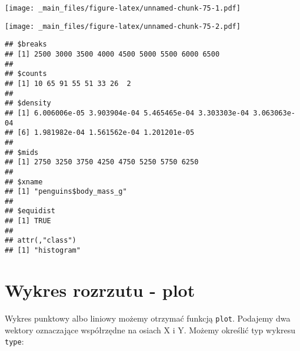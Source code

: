 \documentclass[
]{book}
\newenvironment{Shaded}{\begin{snugshade}}{\end{snugshade}}
\newcommand{\AttributeTok}[1]{\textcolor[rgb]{0.77,0.63,0.00}{#1}}
\newcommand{\CommentTok}[1]{\textcolor[rgb]{0.56,0.35,0.01}{\textit{#1}}}
\newcommand{\ConstantTok}[1]{\textcolor[rgb]{0.00,0.00,0.00}{#1}}
\newcommand{\DecValTok}[1]{\textcolor[rgb]{0.00,0.00,0.81}{#1}}
\newcommand{\FunctionTok}[1]{\textcolor[rgb]{0.00,0.00,0.00}{#1}}
\newcommand{\NormalTok}[1]{#1}
\newcommand{\SpecialCharTok}[1]{\textcolor[rgb]{0.00,0.00,0.00}{#1}}
\newcommand{\StringTok}[1]{\textcolor[rgb]{0.31,0.60,0.02}{#1}}
\begin{document}
\texttt{[image: \_main\_files/figure-latex/unnamed-chunk-75-1.pdf]}

\begin{Shaded}
\end{Shaded}

\texttt{[image: \_main\_files/figure-latex/unnamed-chunk-75-2.pdf]}

\begin{Shaded}
\end{Shaded}

\begin{verbatim}
## $breaks
## [1] 2500 3000 3500 4000 4500 5000 5500 6000 6500
## 
## $counts
## [1] 10 65 91 55 51 33 26  2
## 
## $density
## [1] 6.006006e-05 3.903904e-04 5.465465e-04 3.303303e-04 3.063063e-04
## [6] 1.981982e-04 1.561562e-04 1.201201e-05
## 
## $mids
## [1] 2750 3250 3750 4250 4750 5250 5750 6250
## 
## $xname
## [1] "penguins$body_mass_g"
## 
## $equidist
## [1] TRUE
## 
## attr(,"class")
## [1] "histogram"
\end{verbatim}

\hypertarget{wykres-rozrzutu---plot}{%
\section{Wykres rozrzutu - plot}\label{wykres-rozrzutu---plot}}

Wykres punktowy albo liniowy możemy otrzymać funkcją \texttt{plot}. Podajemy dwa wektory oznaczające współrzędne na osiach X i Y. Możemy określić typ wykresu \texttt{type}:
\end{document}
